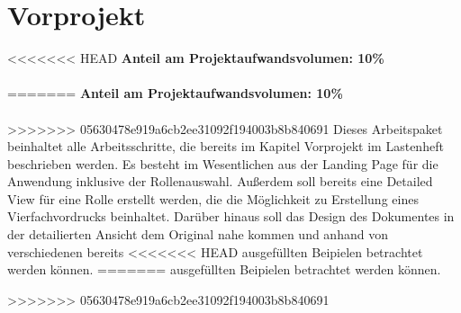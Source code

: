 \section{Vorprojekt} 
<<<<<<< HEAD
\textbf{Anteil am Projektaufwandsvolumen: 10\%}\\ \\
=======
\textbf{Anteil am Projektaufwandsvolumen: 10\%} \\ \\
>>>>>>> 05630478e919a6cb2ee31092f194003b8b840691
Dieses Arbeitspaket beinhaltet alle Arbeitsschritte, die bereits im Kapitel
Vorprojekt im Lastenheft beschrieben werden. Es besteht 
im Wesentlichen aus der Landing Page für die Anwendung inklusive der 
Rollenauswahl. Außerdem soll bereits eine Detailed View für eine Rolle 
erstellt werden, die die Möglichkeit zu Erstellung eines Vierfachvordrucks 
beinhaltet. Darüber hinaus soll das Design des Dokumentes in der detailierten 
Ansicht dem Original nahe kommen und anhand von verschiedenen bereits 
<<<<<<< HEAD
ausgefüllten Beipielen betrachtet werden können.
=======
ausgefüllten Beipielen betrachtet werden können. 

>>>>>>> 05630478e919a6cb2ee31092f194003b8b840691
